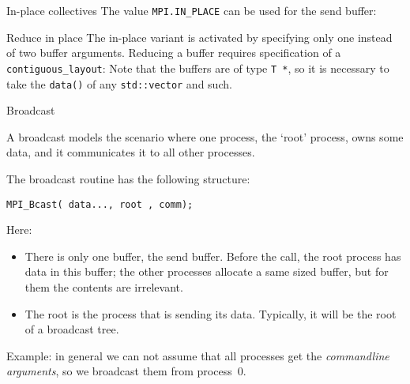 \begin{pythonnote}{In-place collectives}
  The value \lstinline+MPI.IN_PLACE+ can be used for the send buffer:
\end{pythonnote}

\begin{mplnote}{Reduce in place}
  The in-place variant is activated by
  specifying only one instead of two buffer arguments.
  Reducing a buffer requires specification of a \lstinline+contiguous_layout+:
  Note that the buffers are of type \lstinline+T *+, so it is necessary
  to take the \lstinline+data()+ of any \lstinline+std::vector+ and such.
\end{mplnote}

 {Broadcast}
\label{sec:bcast}

A broadcast models the scenario where one process,
the `root' process,
owns some data, and it communicates it to all other processes.

The broadcast routine
has the following structure:
\begin{lstlisting}
MPI_Bcast( data..., root , comm);
\end{lstlisting}
Here:
\begin{itemize}
\item There is only one buffer, the send buffer.
  Before the call, the root process has data in this buffer;
  the other processes allocate a same sized buffer, but
  for them the contents are irrelevant.
\item 
  The root is the process that is sending its data.
  Typically, it will be the root of a broadcast tree.
\end{itemize}

Example: in general we can not assume that all processes get the
\emph{commandline arguments},
so we broadcast them from process~0.


\begin{comment}
  \begin{exercise}
    \label{ex:argv-bcast}
    If you give a commandline argument to a program, that argument is available
    as a character string as part of the \n{argv,argc} pair that you typically use
    as the arguments to your main program. You can use the function \n{atoi} to
    convert such a string to integer.

    Write a program where process~0 looks for an integer on the commandline, and
    broadcasts it to the other processes. Initialize the buffer on all processes, and
    let all processes print out the broadcast number,
    just to check that you solved the problem correctly.
  \end{exercise}
\end{comment}

